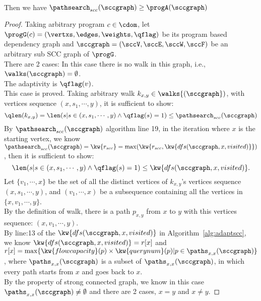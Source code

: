 \\
Then we have
$\pathsearch_{scc}(\sccgraph) \geq \progA(\sccgraph)$
\\
\begin{proof}
  Taking arbitrary program $c \in \cdom$, let $\progG(c) = (\vertxs, \edges, \weights, \qflag)$ be its 
  program based dependency graph and $\sccgraph = (\sccV, \sccE, \sccW, \sccF)$ be an arbitrary sub SCC graph of $\progG$.
  \\
There are 2 cases:
%
In this case there is no walk in this graph, i.e., $\walks(\sccgraph) = \emptyset$.
\\
The adaptivity is $\qflag(v)$.
\\
This case is proved.
%
  Taking arbitrary walk $k_{x,y} \in \walks{(\sccgraph})$, with vertices sequence
  $(x, s_1, \cdots, y)$, it is sufficient to show:
  \[
    \qlen(k_{x,y}) = \len(s | s \in (x, s_1, \cdots, y) \land \qflag(s) = 1) \leq \pathsearch_{scc}(\sccgraph)
  \]
  By $\pathsearch_{scc}(\sccgraph)$ algorithm line 19, in the iteration where $x$ is the starting vertex,
  we know $\pathsearch_{scc}(\sccgraph) = \kw{r_{scc}} = \max(\kw{r_{scc}, \kw{dfs(\sccgraph, x, visited)}})$,
  then it is sufficient to show:
  $$
  \len(s | s \in (x, s_1, \cdots, y) \land \qflag(s) = 1) \leq \kw{dfs(\sccgraph, x, visited)}.
  $$
  Let  $\{v_1, \cdots, x\}$ be the set of all the distinct vertices of $k_{x,y}$'s vertices sequence $(x, s_1, \cdots, y)$, and 
  $(v_1, \cdots, x)$ be a subsequence containing all the vertices in $\{x, v_1, \cdots, y\}$.
  \\
  By the definition of walk,
 there  is a path $p_{x,y} $ from $x$ to $y$ with this vertices sequence: $(x, v_1, \cdots, y)$.
  \\
  By line:13 of the $\kw{dfs(\sccgraph, x, visited)}$ in Algorithm~\ref{alg:adaptscc},
  \\
  we know $\kw{dfs(\sccgraph, x, visited)} = r[x]$ and
  $r[x] = \max\{\kw{flowcapacity}(p) \times \kw{querynum}(p) | p \in \paths_{x,x}(\sccgraph)\}$,
  where $\paths_{x,x}(\sccgraph)$ is a subset of $\paths_{x,x}(\sccgraph)$, in which every path starts from $x$ and goes back to $x$.
  \\
  By the property of strong connected graph, we know in this case  $\paths_{x,x}(\sccgraph) \neq \emptyset$ and there are 2 cases, $x = y$ and $x \neq y$.

\end{proof}
